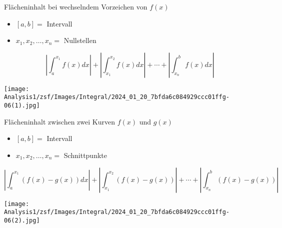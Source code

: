 


\begin{KR}{Flächeninhalt bei wechselndem Vorzeichen von $f(x)$}\\
\begin{itemize}
  \item $[a, b]=$ Intervall
  \item $x_{1}, x_{2}, \ldots, x_{n}=$ Nullstellen
\end{itemize}

$$\left|\int_{a}^{x_{1}} f(x) d x\right|+\left|\int_{x_{1}}^{x_{2}} f(x) d x\right|+\cdots+\left|\int_{x_{n}}^{b} f(x) d x\right|$$
\end{KR}

\begin{center}
\texttt{[image: Analysis1/zsf/Images/Integral/2024\_01\_20\_7bfda6c084929ccc01ffg-06(1).jpg]}
\end{center}

\begin{KR}{Flächeninhalt zwischen zwei Kurven $f(x)$ und $g(x)$}\\
\begin{itemize}
  \item $[a, b]=$ Intervall
  \item $x_{1}, x_{2}, \ldots, x_{n}=$ Schnittpunkte
\end{itemize}
$$\left|\int_{a}^{x_{1}}(f(x)-g(x)) d x\right|+\left|\int_{x_{1}}^{x_{2}}(f(x)-g(x))\right|+\cdots+\left|\int_{x_{n}}^{b}(f(x)-g(x))\right|$$
\end{KR}

\begin{center}
\texttt{[image: Analysis1/zsf/Images/Integral/2024\_01\_20\_7bfda6c084929ccc01ffg-06(2).jpg]}
\end{center}

